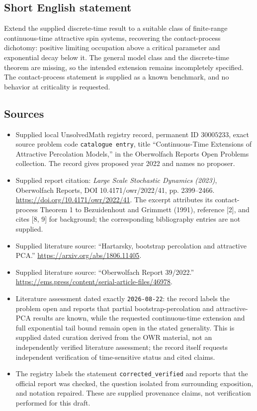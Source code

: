 \documentclass[11pt]{article}
\begin{document}
\subsection{Short English statement}
Extend the supplied discrete-time result to a suitable class of finite-range continuous-time attractive spin systems, recovering the contact-process dichotomy: positive limiting occupation above a critical parameter and exponential decay below it. The general model class and the discrete-time theorem are missing, so the intended extension remains incompletely specified. The contact-process statement is supplied as a known benchmark, and no behavior at criticality is requested.
\subsection{Sources}
\begin{itemize}
\item Supplied local UnsolvedMath registry record, permanent ID \(30005233\), exact source problem code \texttt{catalogue entry}, title ``Continuous-Time Extensions of Attractive Percolation Models,'' in the Oberwolfach Reports Open Problems collection. The record gives proposed year 2022 and names no proposer.
\item Supplied report citation: \emph{Large Scale Stochastic Dynamics (2023)}, Oberwolfach Reports, DOI 10.4171/owr/2022/41, pp. 2399--2466. \url{https://doi.org/10.4171/owr/2022/41}. The excerpt attributes its contact-process Theorem 1 to Bezuidenhout and Grimmett (1991), reference [2], and cites [8, 9] for background; the corresponding bibliography entries are not supplied.
\item Supplied literature source: ``Hartarsky, bootstrap percolation and attractive PCA.'' \url{https://arxiv.org/abs/1806.11405}.
\item Supplied literature source: ``Oberwolfach Report 39/2022.'' \url{https://ems.press/content/serial-article-files/46978}.
\item Literature assessment dated exactly \texttt{2026-08-22}: the record labels the problem open and reports that partial bootstrap-percolation and attractive-PCA results are known, while the requested continuous-time extension and full exponential tail bound remain open in the stated generality. This is supplied dated curation derived from the OWR material, not an independently verified literature assessment; the record itself requests independent verification of time-sensitive status and cited claims.
\item The registry labels the statement \texttt{corrected\_verified} and reports that the official report was checked, the question isolated from surrounding exposition, and notation repaired. These are supplied provenance claims, not verification performed for this draft.
\end{itemize}
\end{document}
